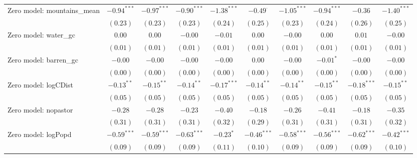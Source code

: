 \begin{table}
\begin{center}
{\begin{tabular}{l c c c c c c c c c}
Zero model: mountains\_mean    & $-0.94^{***}$ & $-0.97^{***}$ & $-0.90^{***}$ & $-1.38^{***}$ & $-0.49^{\cdot}$ & $-1.05^{***}$   & $-0.94^{***}$ & $-0.36$        & $-1.40^{***}$ \\
                               & $(0.23)$      & $(0.23)$      & $(0.23)$      & $(0.24)$      & $(0.25)$        & $(0.23)$        & $(0.24)$      & $(0.26)$       & $(0.25)$      \\
Zero model: water\_gc          & $0.00$        & $0.00$        & $-0.00$       & $-0.01$       & $0.00$          & $-0.00$         & $0.00$        & $0.01$         & $-0.00$       \\
                               & $(0.01)$      & $(0.01)$      & $(0.01)$      & $(0.01)$      & $(0.01)$        & $(0.01)$        & $(0.01)$      & $(0.01)$       & $(0.01)$      \\
Zero model: barren\_gc         & $-0.00$       & $-0.00$       & $-0.00$       & $-0.00$       & $0.00$          & $-0.00$         & $-0.01^{*}$   & $-0.00$        & $-0.00$       \\
                               & $(0.00)$      & $(0.00)$      & $(0.00)$      & $(0.00)$      & $(0.00)$        & $(0.00)$        & $(0.00)$      & $(0.00)$       & $(0.00)$      \\
Zero model: logCDist           & $-0.13^{**}$  & $-0.15^{**}$  & $-0.14^{**}$  & $-0.17^{***}$ & $-0.14^{**}$    & $-0.14^{**}$    & $-0.15^{**}$  & $-0.18^{***}$  & $-0.15^{**}$  \\
                               & $(0.05)$      & $(0.05)$      & $(0.05)$      & $(0.05)$      & $(0.05)$        & $(0.05)$        & $(0.05)$      & $(0.05)$       & $(0.05)$      \\
Zero model: nopastor           & $-0.28$       & $-0.28$       & $-0.23$       & $-0.40$       & $-0.18$         & $-0.26$         & $-0.41$       & $-0.18$        & $-0.35$       \\
                               & $(0.31)$      & $(0.31)$      & $(0.31)$      & $(0.32)$      & $(0.29)$        & $(0.31)$        & $(0.31)$      & $(0.31)$       & $(0.32)$      \\
Zero model: logPopd            & $-0.59^{***}$ & $-0.59^{***}$ & $-0.63^{***}$ & $-0.23^{*}$   & $-0.46^{***}$   & $-0.58^{***}$   & $-0.56^{***}$ & $-0.62^{***}$  & $-0.42^{***}$ \\
                               & $(0.09)$      & $(0.09)$      & $(0.09)$      & $(0.11)$      & $(0.10)$        & $(0.09)$        & $(0.09)$      & $(0.09)$       & $(0.10)$      \\

\end{tabular}}
\end{center}
\end{table}
